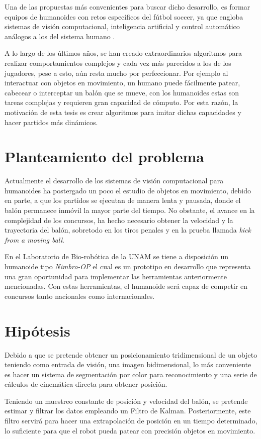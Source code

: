 	Una de las propuestas más convenientes para buscar dicho desarrollo, es formar equipos de humanoides con retos específicos del fútbol soccer, ya que engloba sistemas de visión computacional, inteligencia artificial y control automático análogos a los del sistema humano \citep{gerndt2015humanoid}.
		
	A lo largo de los últimos años, se han creado extraordinarios algoritmos para realizar comportamientos complejos y cada vez más parecidos a los de los jugadores, pese a esto, aún resta mucho por perfeccionar. Por ejemplo al interactuar con objetos en movimiento, un humano puede fácilmente patear, cabecear o interceptar un balón que se mueve, con los humanoides estas son tareas complejas y requieren gran capacidad de cómputo. 
	Por esta razón, la motivación de esta tesis es crear algoritmos para imitar dichas capacidades y hacer partidos más dinámicos.
	
\section{Planteamiento del problema}
	Actualmente el desarrollo de los sistemas de visión computacional para humanoides ha postergado un poco el estudio de objetos en movimiento, debido en parte, a que los partidos se ejecutan de manera lenta y pausada, donde el balón permanece inmóvil la mayor parte del tiempo. No obstante, el avance en la complejidad de los concursos, ha hecho necesario obtener la velocidad y la trayectoria del balón, sobretodo en los tiros penales y en la prueba llamada \textit{kick from a moving ball}.  

	En el Laboratorio de Bio-robótica de la UNAM se tiene a disposición un humanoide tipo \textit{Nimbro-OP} el cual es un prototipo en desarrollo que representa una gran oportunidad para implementar las herramientas anteriormente mencionadas. Con estas herramientas, el humanoide será capaz de competir en concursos tanto nacionales como internacionales.
	 
	
\section{Hipótesis}
	Debido a que se pretende obtener un posicionamiento tridimensional de un objeto teniendo como entrada de visión, una imagen bidimensional, lo más conveniente es hacer un sistema de segmentación por color para reconocimiento y una serie de cálculos de cinemática directa para obtener posición.
	
	Teniendo un muestreo constante de posición y velocidad del balón, se pretende estimar y filtrar los datos empleando un Filtro de Kalman. Posteriormente, este filtro servirá para hacer una extrapolación de posición en un tiempo determinado, lo suficiente para que el robot pueda patear con precisión objetos en movimiento. 
	
